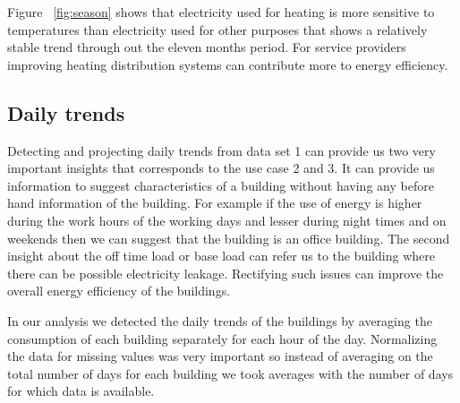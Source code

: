 Figure ~\ref{fig:season} shows that electricity used for heating is more sensitive to temperatures than electricity  used for other purposes that shows a relatively stable trend through out the  eleven months period. For service providers improving heating distribution systems can contribute more to energy efficiency. 

\subsection{Daily trends}
Detecting and projecting daily trends from data set 1 can provide us two very important insights that corresponds to the use case 2 and 3. It can provide us information to suggest characteristics of a building without having any before hand information of the building. For example if the use of energy is higher during the work hours of the working days and lesser during night times and on weekends then we can suggest that the building is an office building. The second insight about the off time load or base load can refer us to the building where there can be possible electricity leakage. Rectifying such issues can improve the overall energy efficiency of the buildings.

In our analysis we detected the daily trends of the buildings by averaging the consumption of each building separately for each hour of the day. Normalizing the data for missing values was very important so instead of averaging on the total number of days for each building we took averages with the number of days for which data is available. 

